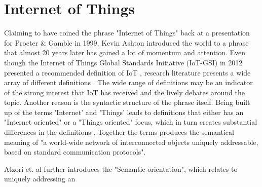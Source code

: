 \chapter{Internet of Things}



Claiming to have coined the phrase "Internet of Things" back at a presentation for Procter \& Gamble in 1999, Kevin Ashton \cite{ashton_iot} introduced the world to a phrase that almost 20 years later has gained a lot of momentum and attention. Even though the Internet of Things Global Standards Initiative (IoT-GSI) in 2012 presented a recommended definition of IoT \cite{itu-t:Y.2060}, research literature presents a wide array  of different definitions\cite{Gubbi:2013:ITV:2489313.2489456} . The wide range of definitions may be an indicator of the strong interest that IoT has received and the lively debates around the topic. Another reason is the syntactic structure of the phrase itself. Being built up of the terms 'Internet' and 'Things' leads to definitions that either has an "Internet oriented" or a "Things oriented" focus, which in turn creates substantial differences in the definitions \cite{Atzori:2010:ITS:1862461.1862541}. Together the  terms produces the semantical meaning of "a world-wide network of interconnected objects uniquely addressable, based on standard communication protocols"\cite{eposs:iot-defination-2008}. 

Atzori et. al \cite{Atzori:2010:ITS:1862461.1862541} further introduces the "Semantic orientation", which relates to uniquely addressing an




